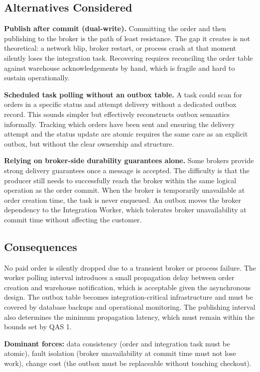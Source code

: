 \subsection{Alternatives Considered}

\textbf{Publish after commit (dual-write).} Committing the order and then publishing to the
broker is the path of least resistance. The gap it creates is not theoretical: a network blip,
broker restart, or process crash at that moment silently loses the integration task. Recovering
requires reconciling the order table against warehouse acknowledgements by hand, which is
fragile and hard to sustain operationally.

\textbf{Scheduled task polling without an outbox table.} A task could scan for orders in a
specific status and attempt delivery without a dedicated outbox record. This sounds simpler but
effectively reconstructs outbox semantics informally. Tracking which orders have been sent and
ensuring the delivery attempt and the status update are atomic requires the same care as an
explicit outbox, but without the clear ownership and structure.

\textbf{Relying on broker-side durability guarantees alone.} Some brokers provide strong
delivery guarantees once a message is accepted. The difficulty is that the producer still needs
to successfully reach the broker within the same logical operation as the order commit. When
the broker is temporarily unavailable at order creation time, the task is never enqueued. An
outbox moves the broker dependency to the Integration Worker, which tolerates broker
unavailability at commit time without affecting the customer.

\subsection{Consequences}

No paid order is silently dropped due to a transient broker or process failure. The worker
polling interval introduces a small propagation delay between order creation and warehouse notification,
which is acceptable given the asynchronous design. The outbox table becomes
integration-critical infrastructure and must be covered by database backups and operational
monitoring. The publishing interval also determines the minimum propagation latency, which must
remain within the bounds set by QAS 1.

\textbf{Dominant forces:} data consistency (order and integration task must be atomic),
fault isolation (broker unavailability at commit time must not lose work), change cost
(the outbox must be replaceable without touching checkout).


